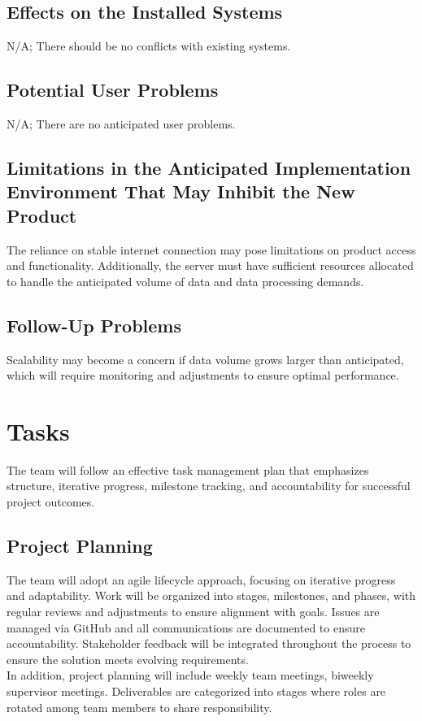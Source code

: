\documentclass[12pt]{article}
\begin{document}
\subsection{Effects on the Installed Systems}
N/A; There should be no conflicts with existing systems.

\subsection{Potential User Problems}
N/A; There are no anticipated user problems.

\subsection{Limitations in the Anticipated Implementation Environment That May
Inhibit the New Product}
The reliance on stable internet connection may pose limitations on product access and functionality. Additionally, the server must have sufficient resources allocated to handle the anticipated volume of data and data processing demands.

\subsection{Follow-Up Problems}
Scalability may become a concern if data volume grows larger than anticipated, which will require monitoring and adjustments to ensure optimal performance.

\section{Tasks}
The team will follow an effective task management plan that emphasizes
structure, iterative progress, milestone tracking, and accountability for
successful project outcomes. 
\subsection{Project Planning}

The team will adopt an agile lifecycle approach, focusing on iterative progress
and adaptability. Work will be organized into stages, milestones, and phases,
with regular reviews and adjustments to ensure alignment with goals. Issues are
managed via GitHub and all communications are documented to ensure
accountability. Stakeholder feedback will be integrated throughout the process
to ensure the solution meets evolving requirements.\\
\newline
In addition, project planning will include weekly team meetings, biweekly
supervisor meetings. Deliverables are categorized into stages where roles are
rotated among team members to share responsibility.
\end{document}
